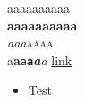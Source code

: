 \documentclass[10pt,a4paper]{article}
\begin{document}
{\tiny a}{\scriptsize a}{\footnotesize a}{\small a}{\normalsize a}{\large a}{\Large a}{\LARGE a}{\huge a}{\Huge a}\\
{\tiny \textbf{a}}{\scriptsize \textbf{a}}{\footnotesize \textbf{a}}{\small \textbf{a}}{\normalsize \textbf{a}}{\large \textbf{a}}{\Large \textbf{a}}{\LARGE \textbf{a}}{\huge \textbf{a}}{\Huge \textbf{a}}\\
{\small \textit{a}}{\normalsize \textit{a}}{\large \textit{a}}{\small \textsc{a}}{\normalsize \textsc{a}}{\large \textsc{a}}{\LARGE \textsc{a}}\\
\textsf{a}\textbf{\textsf{a}}\texttt{a}\textbf{\texttt{a}}\textit{\textbf{a}}\emph{a}
\href{https://example.com}{link}
\begin{itemize}\item Test\end{itemize}
\end{document}
